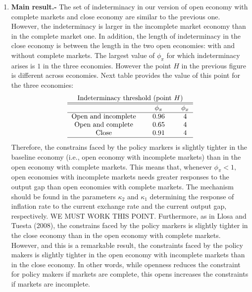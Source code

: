 \documentclass{article}
\begin{document}
\begin{enumerate}
\item \textbf{Main result.- }The set of indeterminacy in our version of open
economy with complete markets and close economy are similar to the previous
one. However, the indeterminacy is larger in the incomplete market economy
than in the complete market one. In addition, the length of indeterminacy in
the close economy is between the length in the two open economies: with and
without complete markets. The largest value of $\phi _{\pi }$ for which
indeterminacy arises is $1$ in the three economies. However the point $H$ in
the previous figure is different across economies. Next table provides the
value of this point for the three economies:%
\begin{equation*}
\begin{tabular}{lcccc}
\multicolumn{5}{c}{Indeterminacy threshold (point $H)$} \\ \hline\hline
&  & $\phi _{\pi }$ &  & $\phi _{x}$ \\ \hline
\multicolumn{1}{c}{Open and incomplete} &  & $0.96$ &  & $4$ \\ 
\multicolumn{1}{c}{Open and complete} &  & $0.65$ &  & $4$ \\ 
\multicolumn{1}{c}{Close} &  & $0.91$ &  & $4$ \\ \hline
\end{tabular}%
\end{equation*}%
Therefore, the constrains faced by the policy markers is slightly tighter in
the baseline economy (i.e., open economy with incomplete markets) than in
the open economy with complete markets. This means that, whenever $\phi
_{\pi }<1,$ open economies with incomplete markets needs greater responses
to the output gap than open economies with complete markets. The mechanism
should be found in the parameters $\kappa _{2}$ and $\kappa _{1}$
determining the response of inflation rate to the current exchange rate and
the current output gap, respectively. WE MUST WORK THIS POINT. Furthermore,
as in Llosa and Tuesta (2008), the constrains faced by the policy markers is
slightly tighter in the close economy than in the open economy with complete
markets. However, and this is a remarkable result, the constraints faced by
the policy makers is slightly tighter in the open economy with incomplete
markets than in the close economy. In other words, while openness reduces
the constraint for policy makers if markets are complete, this opens
increases the constraints if markets are incomplete.


\end{enumerate}
\end{document}
